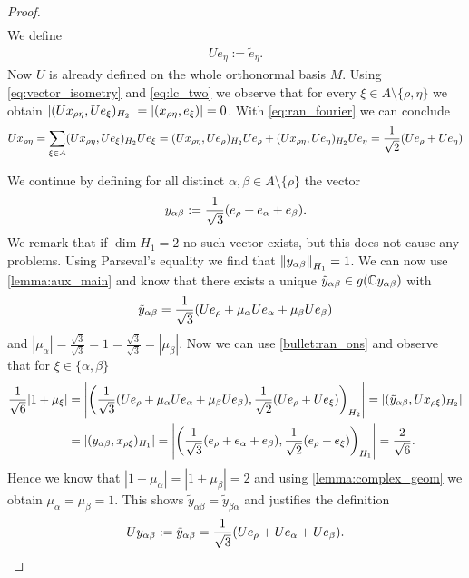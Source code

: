 \begin{proof}
\begin{align*}
	\end{align*}
	We define 
	\begin{align*}
		Ue_\eta := \tilde{e}_\eta.
	\end{align*}
	Now $U$ is already defined on the whole orthonormal basis $M$. Using \eqref{eq:vector_isometry} and \eqref{eq:lc_two} we observe that for every $\xi \in A \setminus \{\rho, \eta\}$ we obtain $\vbraces{(Ux_{\rho \eta}, Ue_\xi)_{H_2}} = |(x_{\rho \eta}, e_\xi)| = 0$. With \eqref{eq:ran_fourier} we can conclude
	\begin{align*}
		Ux_{\rho \eta} = \sum_{\xi \in A} (Ux_{\rho \eta}, Ue_\xi)_{H_2}Ue_\xi = (Ux_{\rho \eta}, Ue_\rho)_{H_2} Ue_\rho + (Ux_{\rho \eta}, Ue_\eta)_{H_2} Ue_\eta =  \frac{1}{\sqrt{2}} \pbraces{Ue_\rho + Ue_\eta}
	\end{align*}
	
	We continue by defining for all distinct $\alpha, \beta \in A \setminus \{\rho\}$ the vector
	\begin{align*}
		y_{\alpha \beta} := \frac{1}{\sqrt{3}} \pbraces{e_\rho + e_\alpha + e_\beta}.
	\end{align*}
	We remark that if $\dim H_1 = 2$ no such vector exists, but this does not cause any problems. Using Parseval's equality we find that $\norm[H_1]{y_{\alpha \beta}} = 1$. We can now use \ref{lemma:aux_main} and know that there exists a unique $\tilde{y}_{\alpha \beta} \in g(\C y_{\alpha \beta})$ with 
	\begin{align*}
		\tilde{y}_{\alpha \beta} = \frac{1}{\sqrt{3}} \pbraces{Ue_\rho + \mu_\alpha Ue_\alpha + \mu_\beta Ue_\beta}
	\end{align*}
	and $|\mu_\alpha| = \frac{\sqrt{3}}{\sqrt{3}} = 1 = \frac{\sqrt{3}}{\sqrt{3}} = |\mu_\beta|$. Now we can use \ref{bullet:ran_ons} and observe that for $\xi \in \{\alpha, \beta\}$
	\begin{align*}
		\frac{1}{\sqrt{6}} \vbraces{1 + \mu_\xi} &= \vbraces{\pbraces{\frac{1}{\sqrt{3}} \pbraces{Ue_\rho + \mu_\alpha Ue_\alpha + \mu_\beta Ue_\beta}, \frac{1}{\sqrt{2}} \pbraces{Ue_\rho + Ue_\xi}}_{H_2}} = |(\tilde{y}_{\alpha \beta}, Ux_{\rho \xi})_{H_2}| \\
		&= |(y_{\alpha \beta}, x_{\rho \xi})_{H_1}| = \vbraces{\pbraces{\frac{1}{\sqrt{3}} \pbraces{e_\rho + e_\alpha + e_\beta}, \frac{1}{\sqrt{2}} (e_\rho + e_\xi)}_{H_1}} = \frac{2}{\sqrt{6}}.
	\end{align*}
	Hence we know that $|1 + \mu_\alpha| = |1 + \mu_\beta| = 2$ and using \ref{lemma:complex_geom} we obtain $\mu_\alpha = \mu_\beta = 1$. This shows $\tilde{y}_{\alpha \beta} = \tilde{y}_{\beta \alpha}$ and justifies the definition
	\begin{align*}
		Uy_{\alpha \beta} := \tilde{y}_{\alpha \beta} = \frac{1}{\sqrt{3}} \pbraces{Ue_\rho + Ue_\alpha + Ue_\beta}.
	\end{align*}
	

\end{proof}
